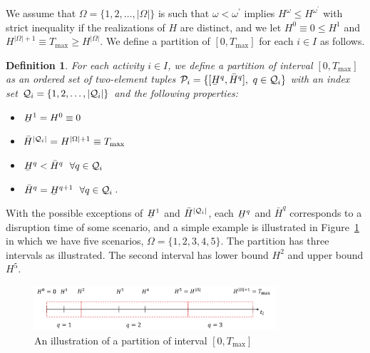 \documentclass[11pt]{article}
\newtheorem{definition}{Definition}
\newcommand{\cQ}{{\cal Q}}
\newcommand{\cP}{{\cal P}}
\renewcommand{\underbar}{\underaccent{\bar}}
\begin{document}
	We assume that $\Omega = \{1,2,\ldots,|\Omega|\}$ is such that $\omega < \omega^\prime$ implies $H^\omega \le H^{\omega^\prime}$ with strict inequality if the realizations of $H$ are distinct, and we let $H^0 \equiv 0 \le H^1$ and $H^{|\Omega|+1} \equiv T_{\max} \ge H^{|\Omega|}$. We define a partition of $[0,T_{\max}]$ for each \(i \in I\) as follows.
	\begin{definition}\label{definition:partition}
		For each activity \(i \in I\), we define a partition of interval \([0,T_{\max}]\)  as an ordered set of two-element tuples  \(\cP_i = \{[\underbar{H}^q,\bar{H}^q],\ q \in \cQ_i\}\) with an index set \(\cQ_i=\{1,2,\ldots,|\cQ_i|\} \) and the following properties: 
		\begin{itemize}
			\item \(\underbar{H}^1 = H^0 \equiv 0\)
			\item \(\bar{H}^{|\cQ_i|} = H^{|\Omega| + 1} \equiv T_{\max}\)
			\item $\underbar{H}^q < \bar{H}^q  \ \ \forall q \in \cQ_i$
			\item \(\bar{H}^q = \underbar{H}^{q + 1} \  \ \forall q \in \cQ_i \).
		\end{itemize}
	\end{definition}
	
	With the possible exceptions of $\underbar{H}^1$ and $\bar{H}^{|\cQ_i|}$, each \(\underbar{H}^q\) and \(\bar{H}^q\) corresponds to a disruption time of some scenario, and a simple example is illustrated in Figure~\ref{fig:simplePart} in which we have five scenarios, \(\Omega = \{1,2,3,4,5\}\). The partition has three intervals as illustrated. The second interval has lower bound \(H^2\) and upper bound \(H^5\).
	\begin{figure}[H]
		\centering
		\includegraphics[width=0.8\textwidth]{simplePart}
		\caption{An illustration of a partition of interval \([0,T_{\max}]\)}
		\label{fig:simplePart}
	\end{figure}
	
\end{document}
